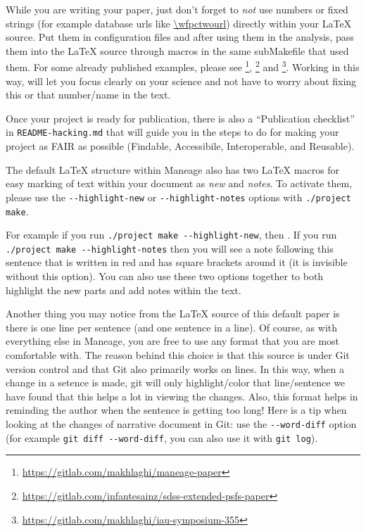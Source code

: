\documentclass[10pt, twocolumn]{article}
\begin{document}
While you are writing your paper, just don't forget to \emph{not} use numbers or fixed strings (for example database urls like \url{\wfpctwourl}) directly within your \LaTeX{} source.
Put them in configuration files and after using them in the analysis, pass them into the \LaTeX{} source through macros in the same subMakefile that used them.
For some already published examples, please see \citet{maneage}\footnote{\url{https://gitlab.com/makhlaghi/maneage-paper}}, \citet{infantesainz20}\footnote{\url{https://gitlab.com/infantesainz/sdss-extended-psfs-paper}} and \citet{akhlaghi19}\footnote{\url{https://gitlab.com/makhlaghi/iau-symposium-355}}.
Working in this way, will let you focus clearly on your science and not have to worry about fixing this or that number/name in the text.

Once your project is ready for publication, there is also a ``Publication checklist'' in \texttt{README-hacking.md} that will guide you in the steps to do for making your project as FAIR as possible (Findable, Accessibile, Interoperable, and Reusable).

The default \LaTeX{} structure within Maneage also has two \LaTeX{} macros for easy marking of text within your document as \emph{new} and \emph{notes}.
To activate them, please use the \texttt{-{}-highlight-new} or \texttt{-{}-highlight-notes} options with \texttt{./project make}.

For example if you run \texttt{./project make -{}-highlight-new}, then .
If you run \texttt{./project make -{}-highlight-notes} then you will see a note following this sentence that is written in red and has square brackets around it (it is invisible without this option).
You can also use these two options together to both highlight the new parts and add notes within the text.

Another thing you may notice from the \LaTeX{} source of this default paper is there is one line per sentence (and one sentence in a line).
Of course, as with everything else in Maneage, you are free to use any format that you are most comfortable with.
The reason behind this choice is that this source is under Git version control and that Git also primarily works on lines.
In this way, when a change in a setence is made, git will only highlight/color that line/sentence we have found that this helps a lot in viewing the changes.
Also, this format helps in reminding the author when the sentence is getting too long!
Here is a tip when looking at the changes of narrative document in Git: use the \texttt{-{}-word-diff} option (for example \texttt{git diff -{}-word-diff}, you can also use it with \texttt{git log}).
\end{document}

